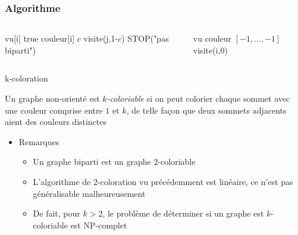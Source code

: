     \begin{frame}[fragile]
        \frametitle{Algorithme}
            \begin{columns}
                \begin{column}{.55\textwidth}
                    \begin{algorithmic}
                    \State vu[i] \gets true
                    \State couleur[i] \gets $c$
                            \State visite(j,1-$c$)
                                \State STOP("pas biparti")
                        \EndIf
                    \EndFor
                    \EndFunction
                                    \end{algorithmic}
                \end{column}
                \begin{column}{.45\textwidth}
                    \begin{algorithmic}
                        \State vu 
                        \State couleur \gets $[-1,...,-1]$
                                \State visite(i,0)
                            \EndIf
                        \EndFor
                    \end{algorithmic}            
                \end{column}
            \end{columns}    
        \end{frame}
        
\begin{frame}{k-coloration}
\begin{definition}
    Un graphe non-orienté est \emph{$k$-coloriable} si on peut colorier chaque sommet avec une couleur comprise entre $1$ et $k$, de telle façon que deux sommets adjacents aient des couleurs distinctes
\end{definition}
\begin{itemize}
    \item Remarques 
    \begin{itemize}
        \item Un graphe biparti est un graphe $2$-coloriable 
        \item L'algorithme de $2$-coloration vu précédemment est linéaire, ce n'est pas généralisable malheureusement
        \item De fait, pour $k>2$, le problème de déterminer si un graphe est $k$-coloriable est NP-complet  
    \end{itemize}
\end{itemize}
\end{frame}

